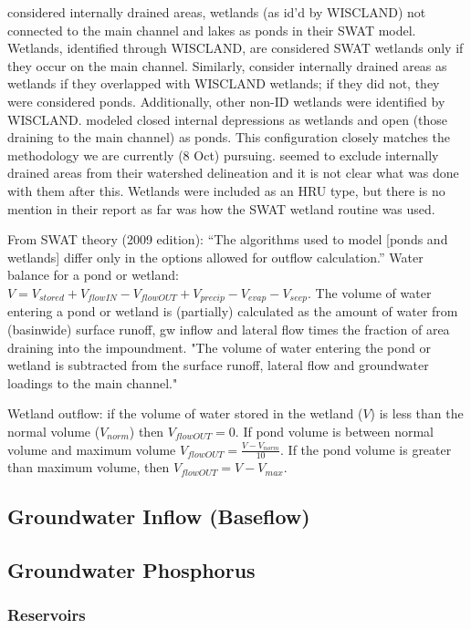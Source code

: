 \documentclass[10pt,letterpaper]{article}%
\begin{document}
 \citet{almendinger_willowriverswat_2007} considered internally drained areas, wetlands (as id'd by WISCLAND) not connected to the main channel and lakes as ponds in their SWAT model. Wetlands, identified through WISCLAND, are considered SWAT wetlands only if they occur on the main channel. Similarly, \citet{kirsch_rock_2002} consider internally drained areas as wetlands if they overlapped with WISCLAND wetlands; if they did not, they were considered ponds. Additionally, other non-ID wetlands were identified by WISCLAND. \citet{almendinger_contructingsunrise_2010} modeled closed internal depressions as wetlands and open (those draining to the main channel) as ponds. This configuration closely matches the methodology we are currently (8 Oct) pursuing. \citet{freihoefer_mead_2007} seemed to exclude internally drained areas from their watershed delineation and it is not clear what was done with them after this. Wetlands were included as an HRU type, but there is no mention in their report as far was how the SWAT wetland routine was used. 
		
		From SWAT theory (2009 edition): ``The algorithms used to model [ponds and wetlands] differ only in the options allowed for outflow calculation.'' Water balance for a pond or wetland: $V = V_{stored} + V_{flowIN} - V_{flowOUT} +V_{precip}-V_{evap}-V_{seep}$. The volume of water entering a pond or wetland is (partially) calculated as the amount of water from (basinwide) surface runoff, gw inflow and lateral flow times the fraction of area draining into the impoundment. "The volume of water entering the pond or wetland is subtracted from the surface runoff, lateral flow and groundwater loadings to the main channel." 
		
		Wetland outflow: if the volume of water stored in the wetland ($V$) is less than the normal volume ($V_{norm}$) then $V_{flowOUT}=0$. If pond volume is between normal volume and maximum volume $V_{flowOUT}=\frac{V-V_{norm}}{10}$. If the pond volume is greater than maximum volume, then $V_{flowOUT}=V-V_{max}$. 
		\subsection{Groundwater Inflow (Baseflow)}
		\subsection{Groundwater Phosphorus}
		\subsubsection{Reservoirs}
	\pagebreak
\end{document}
